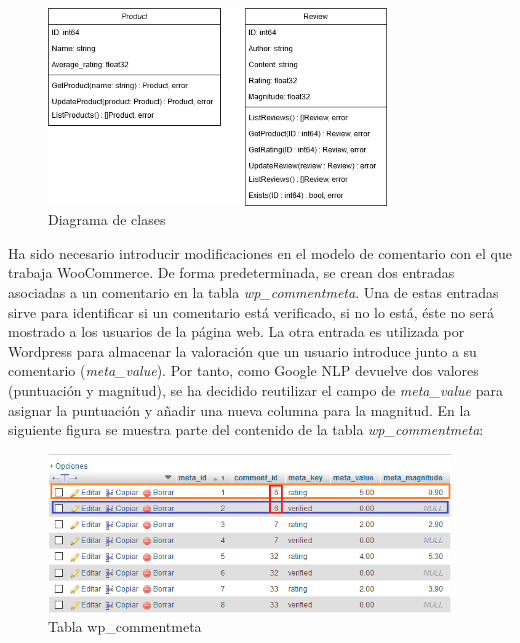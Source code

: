 \begin{itemize}
\begin{itemize}
        \begin{figure}[ht]
        	\begin{center}
        		\includegraphics[width=0.80\textwidth]{Figuras/DiagramaClases.png}
        	\end{center}
        	\caption{\label{fig:classDiagram} Diagrama de clases}
        \end{figure}
        
        \newpage
        
        Ha sido necesario introducir modificaciones en el modelo de comentario con el que trabaja WooCommerce. De forma predeterminada, se crean dos entradas asociadas a un comentario en la tabla \textit{wp\_commentmeta}. Una de estas entradas sirve para identificar si un comentario está verificado, si no lo está, éste no será mostrado a los usuarios de la página web. La otra entrada es utilizada por Wordpress para almacenar la valoración que un usuario introduce junto a su comentario (\textit{meta\_value}). Por tanto, como Google NLP devuelve dos valores (puntuación y magnitud), se ha decidido reutilizar el campo de \textit{meta\_value} para asignar la puntuación y añadir una nueva columna para la magnitud. En la siguiente figura se muestra parte del contenido de la tabla \textit{wp\_commentmeta}:
        
        \begin{figure}[ht]
        	\begin{center}
        		\includegraphics[width = 0.95\textwidth]{Figuras/wp_commentmeta.PNG}
        	\end{center}
        	\caption{\label{fig:commentmeta} Tabla wp\_commentmeta}
        \end{figure}
        

\end{itemize}
\end{itemize}
